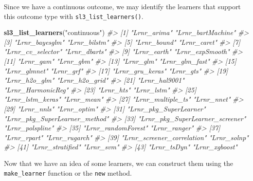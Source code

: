\documentclass[12pt, krantz2,]{krantz}
\newenvironment{Shaded}{\begin{snugshade}}{\end{snugshade}}
\newcommand{\CommentTok}[1]{\textcolor[rgb]{0.37,0.37,0.37}{\textit{#1}}}
\newcommand{\KeywordTok}[1]{\textcolor[rgb]{0.27,0.27,0.27}{\textbf{#1}}}
\newcommand{\NormalTok}[1]{#1}
\newcommand{\OperatorTok}[1]{\textcolor[rgb]{0.43,0.43,0.43}{\textbf{#1}}}
\newcommand{\StringTok}[1]{\textcolor[rgb]{0.5,0.5,0.5}{#1}}
\theoremstyle{definition}
\theoremstyle{definition}
\theoremstyle{definition}
\newcommand{\1}{\mathbbm{1}}
\begin{document}
Since we have a continuous outcome, we may identify the learners that support
this outcome type with \texttt{sl3\_list\_learners()}.

\begin{Shaded}
\begin{Highlighting}[]
\KeywordTok{sl3_list_learners}\NormalTok{(}\StringTok{"continuous"}\NormalTok{)}
\CommentTok{#>  [1] "Lrnr_arima"                     "Lrnr_bartMachine"              }
\CommentTok{#>  [3] "Lrnr_bayesglm"                  "Lrnr_bilstm"                   }
\CommentTok{#>  [5] "Lrnr_bound"                     "Lrnr_caret"                    }
\CommentTok{#>  [7] "Lrnr_cv_selector"               "Lrnr_dbarts"                   }
\CommentTok{#>  [9] "Lrnr_earth"                     "Lrnr_expSmooth"                }
\CommentTok{#> [11] "Lrnr_gam"                       "Lrnr_gbm"                      }
\CommentTok{#> [13] "Lrnr_glm"                       "Lrnr_glm_fast"                 }
\CommentTok{#> [15] "Lrnr_glmnet"                    "Lrnr_grf"                      }
\CommentTok{#> [17] "Lrnr_gru_keras"                 "Lrnr_gts"                      }
\CommentTok{#> [19] "Lrnr_h2o_glm"                   "Lrnr_h2o_grid"                 }
\CommentTok{#> [21] "Lrnr_hal9001"                   "Lrnr_HarmonicReg"              }
\CommentTok{#> [23] "Lrnr_hts"                       "Lrnr_lstm"                     }
\CommentTok{#> [25] "Lrnr_lstm_keras"                "Lrnr_mean"                     }
\CommentTok{#> [27] "Lrnr_multiple_ts"               "Lrnr_nnet"                     }
\CommentTok{#> [29] "Lrnr_nnls"                      "Lrnr_optim"                    }
\CommentTok{#> [31] "Lrnr_pkg_SuperLearner"          "Lrnr_pkg_SuperLearner_method"  }
\CommentTok{#> [33] "Lrnr_pkg_SuperLearner_screener" "Lrnr_polspline"                }
\CommentTok{#> [35] "Lrnr_randomForest"              "Lrnr_ranger"                   }
\CommentTok{#> [37] "Lrnr_rpart"                     "Lrnr_rugarch"                  }
\CommentTok{#> [39] "Lrnr_screener_correlation"      "Lrnr_solnp"                    }
\CommentTok{#> [41] "Lrnr_stratified"                "Lrnr_svm"                      }
\CommentTok{#> [43] "Lrnr_tsDyn"                     "Lrnr_xgboost"}
\end{Highlighting}
\end{Shaded}

Now that we have an idea of some learners, we can construct them using the
\texttt{make\_learner} function or the \texttt{new} method.

\begin{Shaded}
\end{Shaded}
\end{document}
